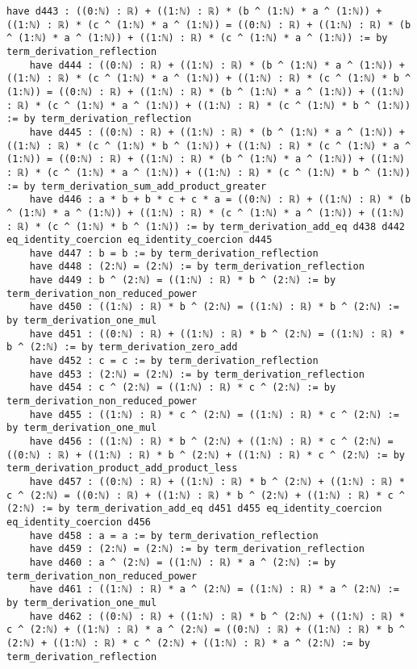 \documentclass{article}
\begin{document}
\begin{tcolorbox}[colback=white!10, width=\linewidth]
\begin{lstlisting}[language=Lean4]
    have d443 : ((0:ℕ) : ℝ) + ((1:ℕ) : ℝ) * (b ^ (1:ℕ) * a ^ (1:ℕ)) + ((1:ℕ) : ℝ) * (c ^ (1:ℕ) * a ^ (1:ℕ)) = ((0:ℕ) : ℝ) + ((1:ℕ) : ℝ) * (b ^ (1:ℕ) * a ^ (1:ℕ)) + ((1:ℕ) : ℝ) * (c ^ (1:ℕ) * a ^ (1:ℕ)) := by term_derivation_reflection
    have d444 : ((0:ℕ) : ℝ) + ((1:ℕ) : ℝ) * (b ^ (1:ℕ) * a ^ (1:ℕ)) + ((1:ℕ) : ℝ) * (c ^ (1:ℕ) * a ^ (1:ℕ)) + ((1:ℕ) : ℝ) * (c ^ (1:ℕ) * b ^ (1:ℕ)) = ((0:ℕ) : ℝ) + ((1:ℕ) : ℝ) * (b ^ (1:ℕ) * a ^ (1:ℕ)) + ((1:ℕ) : ℝ) * (c ^ (1:ℕ) * a ^ (1:ℕ)) + ((1:ℕ) : ℝ) * (c ^ (1:ℕ) * b ^ (1:ℕ)) := by term_derivation_reflection
    have d445 : ((0:ℕ) : ℝ) + ((1:ℕ) : ℝ) * (b ^ (1:ℕ) * a ^ (1:ℕ)) + ((1:ℕ) : ℝ) * (c ^ (1:ℕ) * b ^ (1:ℕ)) + ((1:ℕ) : ℝ) * (c ^ (1:ℕ) * a ^ (1:ℕ)) = ((0:ℕ) : ℝ) + ((1:ℕ) : ℝ) * (b ^ (1:ℕ) * a ^ (1:ℕ)) + ((1:ℕ) : ℝ) * (c ^ (1:ℕ) * a ^ (1:ℕ)) + ((1:ℕ) : ℝ) * (c ^ (1:ℕ) * b ^ (1:ℕ)) := by term_derivation_sum_add_product_greater
    have d446 : a * b + b * c + c * a = ((0:ℕ) : ℝ) + ((1:ℕ) : ℝ) * (b ^ (1:ℕ) * a ^ (1:ℕ)) + ((1:ℕ) : ℝ) * (c ^ (1:ℕ) * a ^ (1:ℕ)) + ((1:ℕ) : ℝ) * (c ^ (1:ℕ) * b ^ (1:ℕ)) := by term_derivation_add_eq d438 d442 eq_identity_coercion eq_identity_coercion d445
    have d447 : b = b := by term_derivation_reflection
    have d448 : (2:ℕ) = (2:ℕ) := by term_derivation_reflection
    have d449 : b ^ (2:ℕ) = ((1:ℕ) : ℝ) * b ^ (2:ℕ) := by term_derivation_non_reduced_power
    have d450 : ((1:ℕ) : ℝ) * b ^ (2:ℕ) = ((1:ℕ) : ℝ) * b ^ (2:ℕ) := by term_derivation_one_mul
    have d451 : ((0:ℕ) : ℝ) + ((1:ℕ) : ℝ) * b ^ (2:ℕ) = ((1:ℕ) : ℝ) * b ^ (2:ℕ) := by term_derivation_zero_add
    have d452 : c = c := by term_derivation_reflection
    have d453 : (2:ℕ) = (2:ℕ) := by term_derivation_reflection
    have d454 : c ^ (2:ℕ) = ((1:ℕ) : ℝ) * c ^ (2:ℕ) := by term_derivation_non_reduced_power
    have d455 : ((1:ℕ) : ℝ) * c ^ (2:ℕ) = ((1:ℕ) : ℝ) * c ^ (2:ℕ) := by term_derivation_one_mul
    have d456 : ((1:ℕ) : ℝ) * b ^ (2:ℕ) + ((1:ℕ) : ℝ) * c ^ (2:ℕ) = ((0:ℕ) : ℝ) + ((1:ℕ) : ℝ) * b ^ (2:ℕ) + ((1:ℕ) : ℝ) * c ^ (2:ℕ) := by term_derivation_product_add_product_less
    have d457 : ((0:ℕ) : ℝ) + ((1:ℕ) : ℝ) * b ^ (2:ℕ) + ((1:ℕ) : ℝ) * c ^ (2:ℕ) = ((0:ℕ) : ℝ) + ((1:ℕ) : ℝ) * b ^ (2:ℕ) + ((1:ℕ) : ℝ) * c ^ (2:ℕ) := by term_derivation_add_eq d451 d455 eq_identity_coercion eq_identity_coercion d456
    have d458 : a = a := by term_derivation_reflection
    have d459 : (2:ℕ) = (2:ℕ) := by term_derivation_reflection
    have d460 : a ^ (2:ℕ) = ((1:ℕ) : ℝ) * a ^ (2:ℕ) := by term_derivation_non_reduced_power
    have d461 : ((1:ℕ) : ℝ) * a ^ (2:ℕ) = ((1:ℕ) : ℝ) * a ^ (2:ℕ) := by term_derivation_one_mul
    have d462 : ((0:ℕ) : ℝ) + ((1:ℕ) : ℝ) * b ^ (2:ℕ) + ((1:ℕ) : ℝ) * c ^ (2:ℕ) + ((1:ℕ) : ℝ) * a ^ (2:ℕ) = ((0:ℕ) : ℝ) + ((1:ℕ) : ℝ) * b ^ (2:ℕ) + ((1:ℕ) : ℝ) * c ^ (2:ℕ) + ((1:ℕ) : ℝ) * a ^ (2:ℕ) := by term_derivation_reflection

\end{lstlisting}
\end{tcolorbox}
\end{document}
